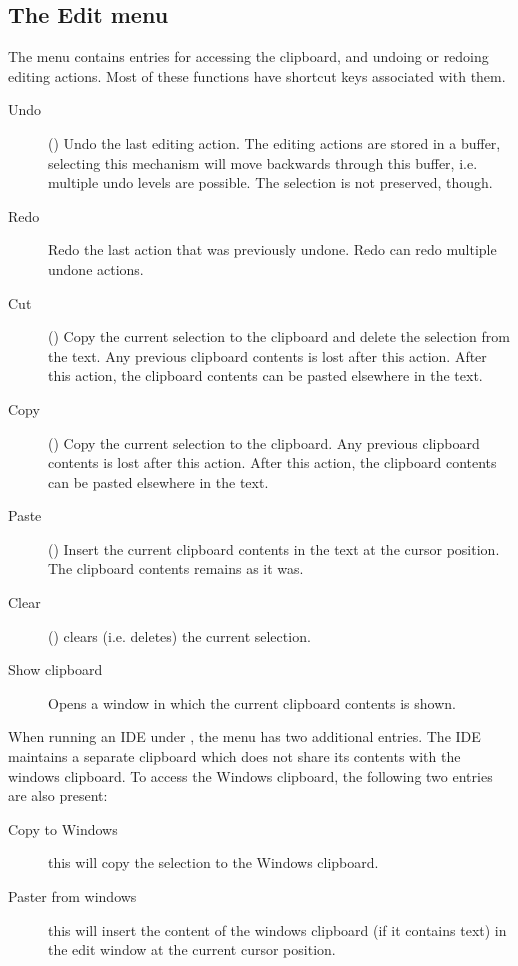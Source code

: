\subsection{The Edit menu}
\label{se:menuedit}
The  menu contains entries for accessing the clipboard, and
undoing or redoing editing actions. Most of these functions have shortcut
keys associated with them.
\begin{description}
\item[Undo] ()
Undo the last editing action. The editing actions are stored in a buffer,
selecting this mechanism will move backwards through this buffer, i.e.
multiple undo levels are possible. The selection is not preserved, though.
\item[Redo] Redo the last action that was previously undone. Redo can redo
multiple undone actions. 
\item[Cut] () Copy the current selection to the clipboard
and delete the selection from the text. Any previous clipboard contents is
lost after this action. After this action, the clipboard contents can be 
pasted elsewhere in the text.
\item[Copy] () Copy the current selection to the clipboard.
Any previous clipboard contents is lost after this action. 
After this action, the clipboard contents can be pasted elsewhere in the text.
\item[Paste] () Insert the current clipboard contents in
the text at the cursor position. The clipboard contents remains as it was.
\item[Clear] () clears (i.e. deletes) the current
selection.
\item[Show clipboard] Opens a window in which the current clipboard contents
is shown.
\end{description}
When running an IDE under \windows, the  menu has two
additional entries. The IDE maintains a separate clipboard which does 
not share its contents with the windows clipboard. To access the Windows
clipboard, the following two entries are also present:
\begin{description}
\item[Copy to Windows] this will copy the selection to the Windows
clipboard. 
\item[Paster from windows] this will insert the content of the windows
clipboard (if it contains text) in the edit window at the current cursor
position.
\end{description}

